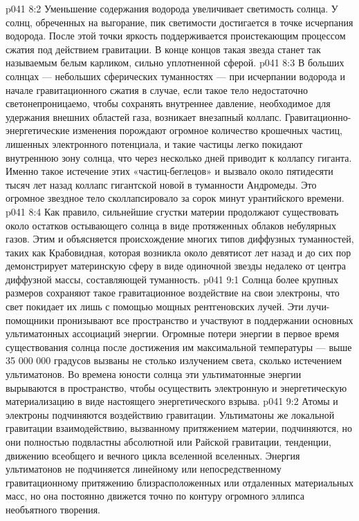 \vs p041 8:2 \pc Уменьшение содержания водорода увеличивает светимость солнца. У солнц, обреченных на выгорание, пик светимости достигается в точке исчерпания водорода. После этой точки яркость поддерживается проистекающим процессом сжатия под действием гравитации. В конце концов такая звезда станет так называемым белым карликом, сильно уплотненной сферой.
\vs p041 8:3 \pc В больших солнцах --- небольших сферических туманностях --- при исчерпании водорода и начале гравитационного сжатия в случае, если такое тело недостаточно светонепроницаемо, чтобы сохранять внутреннее давление, необходимое для удержания внешних областей газа, возникает внезапный коллапс. Гравитационно\hyp{}энергетические изменения порождают огромное количество крошечных частиц, лишенных электронного потенциала, и такие частицы легко покидают внутреннюю зону солнца, что через несколько дней приводит к коллапсу гиганта. Именно такое истечение этих «частиц\hyp{}беглецов» и вызвало около пятидесяти тысяч лет назад коллапс гигантской новой в туманности Андромеды. Это огромное звездное тело сколлапсировало за сорок минут урантийского времени.
\vs p041 8:4 Как правило, сильнейшие сгустки материи продолжают существовать около остатков остывающего солнца в виде протяженных облаков небулярных газов. Этим и объясняется происхождение многих типов диффузных туманностей, таких как Крабовидная, которая возникла около девятисот лет назад и до сих пор демонстрирует материнскую сферу в виде одиночной звезды недалеко от центра диффузной массы, составляющей туманность.
\vs p041 9:1 Солнца более крупных размеров сохраняют такое гравитационное воздействие на свои электроны, что свет покидает их лишь с помощью мощных рентгеновских лучей. Эти лучи\hyp{}помощники пронизывают все пространство и участвуют в поддержании основных ультиматонных ассоциаций энергии. Огромные потери энергии в первое время существования солнца после достижения им максимальной температуры --- выше 35 000 000 градусов вызваны не столько излучением света, сколько истечением ультиматонов. Во времена юности солнца эти ультиматонные энергии вырываются в пространство, чтобы осуществить электронную и энергетическую материализацию в виде настоящего энергетического взрыва.
\vs p041 9:2 \pc Атомы и электроны подчиняются воздействию гравитации. Ультиматоны же локальной гравитации взаимодействию, вызванному притяжением материи,  подчиняются, но они полностью подвластны абсолютной или Райской гравитации, тенденции, движению всеобщего и вечного цикла вселенной вселенных. Энергия ультиматонов не подчиняется линейному или непосредственному гравитационному притяжению близрасположенных или отдаленных материальных масс, но она постоянно движется точно по контуру огромного эллипса необъятного творения.
